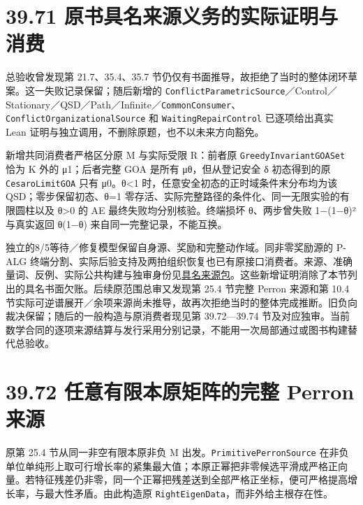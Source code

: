 \documentclass[
  11pt,
  oneside]{book}
\begin{document}
\section{39.71 原书具名来源义务的实际证明与消费}\label{ux539fux4e66ux5177ux540dux6765ux6e90ux4e49ux52a1ux7684ux5b9eux9645ux8bc1ux660eux4e0eux6d88ux8d39}

总验收曾发现第 21.7、35.4、35.7 节仍仅有书面推导，故拒绝了当时的整体闭环草案。这一失败记录保留；随后新增的 \nolinkurl{ConflictParametricSource}／Control／Stationary／QSD／Path／Infinite／\nolinkurl{CommonConsumer}、\nolinkurl{ConflictOrganizationalSource} 和 \nolinkurl{WaitingRepairControl} 已逐项给出真实 Lean 证明与独立调用，不删除原题，也不以未来方向豁免。

新增共同消费者严格区分原 M 与实际受限 R：前者原 \nolinkurl{GreedyInvariantGOASet} 恰为 K 外的 μ1；后者完整 GOA 是所有 μθ，但从登记安全 δ 初态得到的原 \nolinkurl{CesaroLimitGOA} 只有 μ0。θ\textless1 时，任意安全初态的正时域条件末分布均为该 QSD；零步保留初态、θ=1 零存活、实际完整路径的条件化、同一无限实验的有限圆柱以及 θ\textgreater0 的 AE 最终失败均分别核验。终端损坏 θ、两步曾失败 1−(1−θ)² 与真实返回 θ(1−θ) 来自同一完整记录，不能互换。

独立的8/5等待／修复模型保留自身源、奖励和完整动作域。同非零奖励源的 P-ALG 终端分割、实际后验支持及两拍组织恢复也已有原接口消费者。来源、准确量词、反例、实际公共构建与独审身份见\href{../formalization/ueot-core/docs/compression/theory_completion/unified_closure/conflict_family_book_source_v1/RESULTS_AND_OPEN_OBLIGATIONS.md}{具名来源包}。这些新增证明消除了本节列出的具名书面欠账。后续原范围总审又发现第 25.4 节完整 Perron 来源和第 10.4 节实际可逆谱展开／余项来源尚未推导，故再次拒绝当时的整体完成推断。旧负向裁决保留；随后的一般构造与原消费者现见第 39.72---39.74 节及对应独审。当前数学合同的逐项来源结算与发行采用分别记录，不能用一次局部通过或图书构建替代总验收。

\section{39.72 任意有限本原矩阵的完整 Perron 来源}\label{ux4efbux610fux6709ux9650ux672cux539fux77e9ux9635ux7684ux5b8cux6574-perron-ux6765ux6e90}

原第 25.4 节从同一非空有限本原非负 M 出发。\nolinkurl{PrimitivePerronSource} 在非负单位单纯形上取可行增长率的紧集最大值；本原正幂把非零候选平滑成严格正向量。若特征残差仍非零，同一个正幂把残差送到全部严格正坐标，便可严格提高增长率，与最大性矛盾。由此构造原 \nolinkurl{RightEigenData}，而非外给主根存在性。
\end{document}
